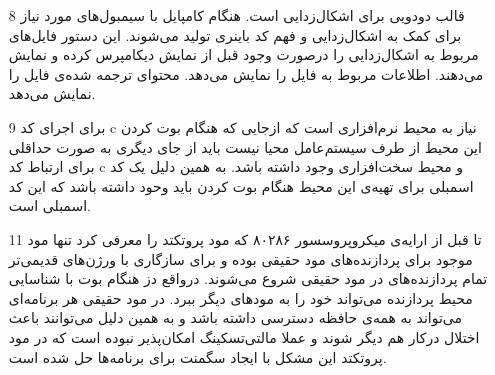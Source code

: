 \begin{itemize}
	\item [8]
	قالب دودویی برای اشکال‌زدایی است. هنگام کامپایل با 
	سیمبول‌های مورد نیاز برای کمک به اشکال‌زدایی و فهم کد باینری تولید می‌شوند.
	این دستور فایل‌های مربوط به اشکال‌زدایی را درصورت وجود قبل از نمایش دیکامپرس کرده و نمایش می‌دهند.
	اطلاعات مربوط به فایل 
	را نمایش می‌دهد.
	محتوای ترجمه شده‌ی فایل 
	را نمایش می‌دهد.
	
	\item [9]
	برای اجرای کد c نیاز به محیط نرم‌افزاری است که ازجایی که هنگام بوت کردن این محیط از طرف سیستم‌عامل محیا نیست باید از جای دیگری به صورت حداقلی برای ارتباط کد c و محیط سخت‌افزاری وجود داشته باشد. به همین دلیل یک کد اسمبلی برای تهیه‌‌ی این محیط هنگام بوت کردن باید وحود داشته باشد که 
	این کد اسمبلی است.
	\item [11]
	تا قبل از ارایه‌ی میکروپروسسور ۸۰۲۸۶ که مود پروتکتد را معرفی کرد تنها مود موجود برای پردازنده‌های 
	مود حقیقی بوده و برای سازگاری با ورژن‌های قدیمی‌تر تمام پردازنده‌های 
	در مود حقیقی شروع می‌شوند. درواقع دز هنگام بوت با شناسایی محیط پردازنده می‌تواند خود را به مودهای دیگر ببرد.
	در مود حقیقی هر برنامه‌ای می‌تواند به همه‌ی حافظه دسترسی داشته باشد و به همین دلیل می‌توانند باعث اختلال درکار هم دیگر شوند و عملا مالتی‌تسکینگ امکان‌پذیر نبوده است که در مود پروتکتد این مشکل با ایجاد سگمنت برای برنامه‌ها حل شده است.
	
\end{itemize}